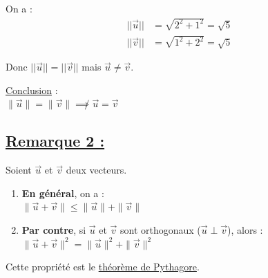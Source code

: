 \documentclass{article}
\begin{document}
\vspace{0.5em}

\noindent On a :
\begin{align*}
||\vec{u}|| &= \sqrt{2^2 + 1^2} = \sqrt{5} \\
||\vec{v}|| &= \sqrt{1^2 + 2^2} = \sqrt{5}
\end{align*}

\noindent Donc $||\vec{u}|| = ||\vec{v}||$ mais $\vec{u} \neq \vec{v}$.

\noindent \underline{Conclusion} : \\
$\|\vec{u}\| = \|\vec{v}\| \not\implies \vec{u} = \vec{v}$

\subsection*{\underline{\color{red}Remarque 2 :}}
Soient $\vec{u}$ et $\vec{v}$ deux vecteurs.
\begin{enumerate}
    \item[i)] \textbf{En général}, on a : \\
    $\|\vec{u} + \vec{v}\| \leq \|\vec{u}\| + \|\vec{v}\|$
    
    \item[ii)] \textbf{Par contre}, si $\vec{u}$ et $\vec{v}$ sont orthogonaux ($\vec{u} \perp \vec{v}$), alors : \\
    $\|\vec{u} + \vec{v}\|^2 = \|\vec{u}\|^2 + \|\vec{v}\|^2$
\end{enumerate}

\noindent Cette propriété est le \underline{théorème de Pythagore}.
\end{document}
